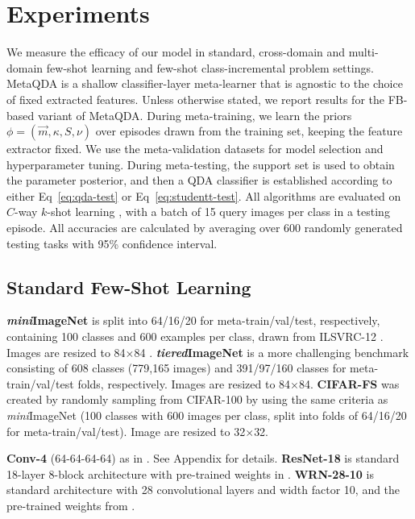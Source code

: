 \documentclass[10pt,twocolumn,letterpaper]{article}
\def\tierIN{\textit{tiered}ImageNet}
\def\miniIN{\textit{mini}ImageNet}
\begin{document}
\section{Experiments}

We measure the efficacy of our model in standard, cross-domain and multi-domain few-shot learning and few-shot class-incremental problem settings. MetaQDA is a shallow classifier-layer meta-learner that is agnostic to the choice of fixed extracted features. Unless otherwise stated, we report results for the FB-based variant of MetaQDA.
During meta-training, we learn the priors $\phi = (\vec m, \kappa, S, \nu)$ over episodes drawn from the training set, keeping the feature extractor fixed. We use the meta-validation datasets for model selection and hyperparameter tuning. During meta-testing, the support set is used to obtain the parameter posterior, and then a QDA classifier is established according to either Eq~\ref{eq:qda-test} or Eq~\ref{eq:studentt-test}. All algorithms are evaluated on $C$-way $k$-shot learning \cite{snell2017prototypical}, with a batch of 15 query images per class in a testing episode. All accuracies are calculated by averaging over 600 randomly generated testing tasks with 95\% confidence interval.

\subsection{Standard Few-Shot Learning}

\textbf{\miniIN} \cite{ravi2017optimization} is split into 64/16/20 for meta-train/val/test, respectively, containing 100 classes and 600 examples per class, drawn from ILSVRC-12 \cite{russakovsky2015imagenet}. Images are resized to 84$\times$84 \cite{he2016deep}.
\textbf{\tierIN} is a more challenging benchmark \cite{ren2018meta} consisting of 608 classes (779,165 images) and 391/97/160 classes for meta-train/val/test folds, respectively. Images are resized to 84$\times$84.
\textbf{CIFAR-FS} \cite{bertinetto2019R2D2} was created by randomly sampling from CIFAR-100 \cite{krizhevsky2009learning} by using the same criteria as \miniIN{} (100 classes with 600 images per class, split into folds of 64/16/20 for meta-train/val/test). Image are resized to 32$\times$32.

\textbf{Conv-4} (64-64-64-64) as in \cite{snell2017prototypical}. 
See Appendix for details. 
\textbf{ResNet-18} is standard 18-layer 8-block architecture with pre-trained weights in \cite{wang2019simpleshot}. \textbf{WRN-28-10} is standard architecture with 28 convolutional layers and width factor 10, and the pre-trained weights from \cite{mangla2020charting}.
\end{document}
